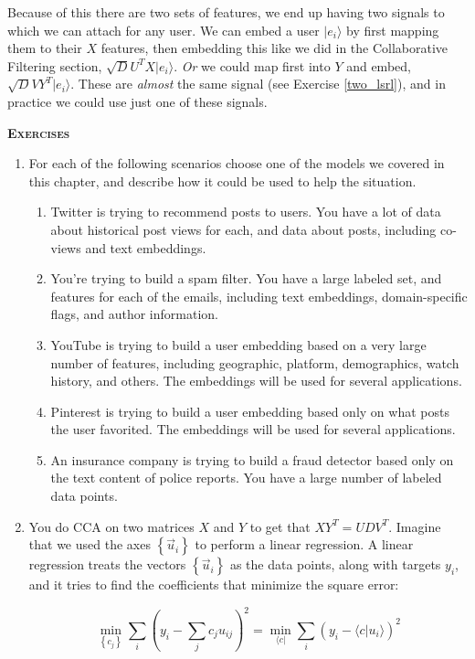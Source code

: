 \documentclass{amsbook}
\begin{document}
Because of this there are two sets of features, we end up having two signals to which we can attach for any user.  We can embed a user $|e_i\rangle$ by first mapping them to their $X$ features, then embedding this like we did in the Collaborative Filtering section, $\sqrt DU^TX|e_i\rangle$.  {\it Or} we could map first into $Y$ and embed, $\sqrt DVY^T|e_i\rangle$.  These are {\it almost} the same signal (see Exercise \ref{two_lsrl}), and in practice we could use just one of these signals.

{\bfseries\scshape\Large Exercises}

\begin{enumerate}
\item For each of the following scenarios choose one of the models we covered in this chapter, and describe how it could be used to help the situation.
\begin{enumerate}
\item Twitter is trying to recommend posts to users.  You have a lot of data about historical post views for each, and data about posts, including co-views and text embeddings.
\item You're trying to build a spam filter.  You have a large labeled set, and features for each of the emails, including text embeddings, domain-specific flags, and author information.
\item YouTube is trying to build a user embedding based on a very large number of features, including geographic, platform, demographics, watch history, and others.  The embeddings will be used for several applications.
\item Pinterest is trying to build a user embedding based only on what posts the user favorited.  The embeddings will be used for several applications.
\item An insurance company is trying to build a fraud detector based only on the text content of police reports.  You have a large number of labeled data points.
\end{enumerate}
\item \label{two_lsrl} You do CCA on two matrices $X$ and $Y$ to get that $XY^T=UDV^T$.  Imagine that we used the axes $\left\{\vec u_i\right\}$ to perform a linear regression.  A linear regression treats the vectors $\left\{\vec u_i\right\}$ as the data points, along with targets $y_i$, and it tries to find the coefficients that minimize the square error:

$$
\min_{\left\{c_j\right\}}\sum_i \left(y_i-\sum_jc_ju_{ij}\right)^2 = \min_{\langle c|}\sum_i \left(y_i-\langle c|u_{i}\rangle\right)^2
$$


\end{enumerate}
\end{document}
